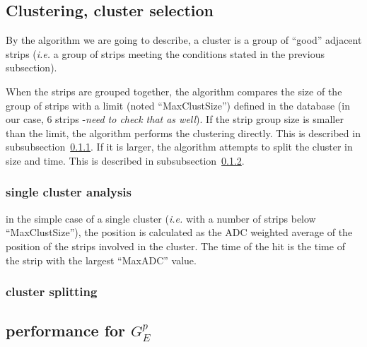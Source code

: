 \subsection{Clustering, cluster selection}
\label{cluster_algo}

By the algorithm we are going to describe, a cluster is a group of ``good'' adjacent strips ({\it i.e.} a group of strips meeting the conditions stated in the previous subsection).

When the strips are grouped together, the algorithm compares the size of the group of strips
with a limit (noted ``MaxClustSize'') defined in the database (in our case, 6 strips -{\em need to check that as well}).
If the strip group size is smaller than the limit, the algorithm performs the clustering directly. This is described in subsubsection~\ref{single_cluster}.
If it is larger, the algorithm attempts to split the cluster in size and time. This is described in subsubsection~\ref{cluster_split}.

\subsubsection{single cluster analysis}
\label{single_cluster}
in the simple case of a single cluster ({\it i.e.} with a number of strips below ``MaxClustSize''), the position is calculated as the ADC weighted average of the position of the strips involved in the cluster. The time of the hit is the time of the strip with the largest ``MaxADC'' value.

\subsubsection{cluster splitting}
\label{cluster_split}



\subsection{performance for $G_E^p$}

%
%
%
%

